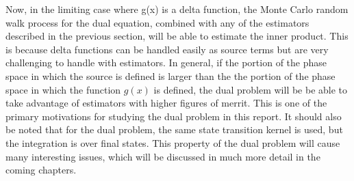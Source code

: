 Now, in the limiting case where g(x) is a delta function, the Monte Carlo
random walk process for the dual equation, combined with any of the estimators 
described in the previous section, will be able to estimate the inner product. 
This is because delta functions can be handled easily as source terms but
are very challenging to handle with estimators. In general, if the portion of 
the phase space in which the source is defined is larger than the the portion 
of the phase space in which the function $g(x)$ is defined, the dual problem
will be be able to take advantage of estimators with higher figures of merrit. 
This is one of the primary motivations for studying the dual problem in this
report. It should also be noted that for the dual problem, the same state 
transition kernel is used, but the integration is over final states. This 
property of the dual problem will cause many interesting issues, which will be 
discussed in much more detail in the coming chapters.

